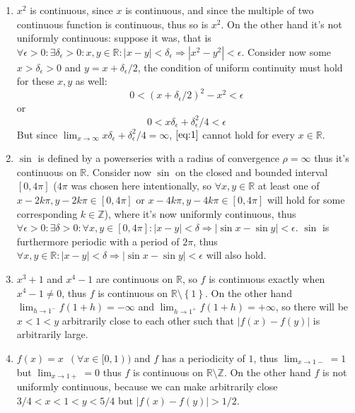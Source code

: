 \documentclass[11pt]{article}
\newcommand{\abs}[1]{\left|#1\right|}
\begin{document}
\begin{enumerate}
\begin{enumerate}
    \item $x^2$ is continuous, since $x$ is continuous, and since the multiple of two continuous function is continuous, thus so is $x^2$. On the other hand it's not uniformly continuous: suppose it was, that is $\forall \epsilon > 0\colon \exists \delta_\epsilon > 0\colon x, y \in \mathbb{R}\colon \abs{x - y} < \delta_\epsilon\Rightarrow\abs{x^2 - y^2} < \epsilon$. Consider now some $x > \delta_\epsilon > 0$ and $y = x + \delta_\epsilon/2$, the condition of uniform continuity must hold for these $x, y$ as well:
        $$0 < (x+\delta_\epsilon/2)^2 - x^2 < \epsilon$$
    or
        \begin{equation}\label{eq:1}0 < x\delta_\epsilon + \delta_\epsilon^2/4 < \epsilon\end{equation}
    But since $\lim_{x\to\infty}x\delta_\epsilon + \delta_\epsilon^2/4 = \infty$, $\eqref{eq:1}$ cannot hold for every $x\in\mathbb{R}$.
    \item
    $\sin$ is defined by a powerseries with a radius of convergence $\rho = \infty$ thus it's continuous on $\mathbb{R}$. Consider now $\sin$ on the closed and bounded interval $[0, 4\pi]$ ($4\pi$ was chosen here intentionally, so $\forall x, y \in \mathbb{R}$ at least one of  $x-2k\pi, y-2k\pi \in [0, 4\pi]$ or $x-4k\pi, y-4k\pi \in [0, 4\pi]$ will hold for some corresponding $k\in\mathbb{Z}$), where it's now uniformly continuous, thus $\forall \epsilon > 0\colon \exists \delta > 0\colon \forall x, y \in [0, 4\pi]\colon \abs{x - y} < \delta \Rightarrow \abs{\sin{x} - \sin{y}} < \epsilon$. $\sin$ is furthermore periodic with a period of $2\pi$, thus $\forall x, y \in \mathbb{R}\colon \abs{x-y} < \delta \Rightarrow \abs{\sin{x} - \sin{y}} < \epsilon$ will also hold.
    \item $x^3 + 1$ and $x^4-1$ are continuous on $\mathbb{R}$, so $f$ is continuous exactly when $x^4-1 \neq 0$, thus $f$ is continuous on $\mathbb{R}\setminus\left\{1\right\}$. On the other hand $\lim_{h\to1^-}f(1+h) = -\infty$ and $\lim_{h\to1^+}f(1+h) = +\infty$, so there will be $x < 1 < y$ arbitrarily close to each other such that $\abs{f(x) - f(y)}$ is arbitrarily large.
    \item $f(x) = x\phantom{0}(\forall x \in [0, 1))$ and $f$ has a periodicity of $1$, thus $\lim_{x\to1-} = 1$ but $\lim_{x\to1+} = 0$ thus $f$ is continuous on $\mathbb{R} \setminus \mathbb{Z}$. On the other hand $f$ is not uniformly continuous, because we can make arbitrarily close $3/4 < x < 1 < y < 5/4$ but $\abs{f(x) - f(y)} > 1/2$.
\end{enumerate}


\end{enumerate}
\end{document}
